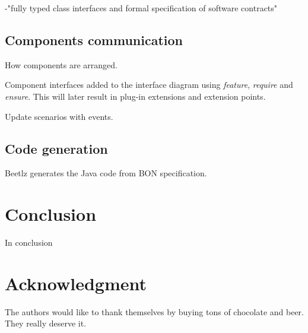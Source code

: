 \documentclass[conference]{IEEEtran}
\begin{document}
-"fully typed class interfaces and formal specification of software contracts"

%
\subsection{Components communication}
\label{sec:comp-comm}

How components are arranged.

Component interfaces added to the interface diagram using
\emph{feature}, \emph{require} and \emph{ensure}. This will later
result in plug-in extensions and extension points.

Update scenarios with events.

%
\subsection{Code generation}
\label{sec:code-generation}

Beetlz generates the Java code from BON specification.

\section{Conclusion}
\label{sec:conclusion}

In conclusion


\section*{Acknowledgment}
\label{sec:acknowledgment}

The authors would like to thank themselves by buying tons of chocolate
and beer. They really deserve it. 



%
%
%
%





\end{document}
